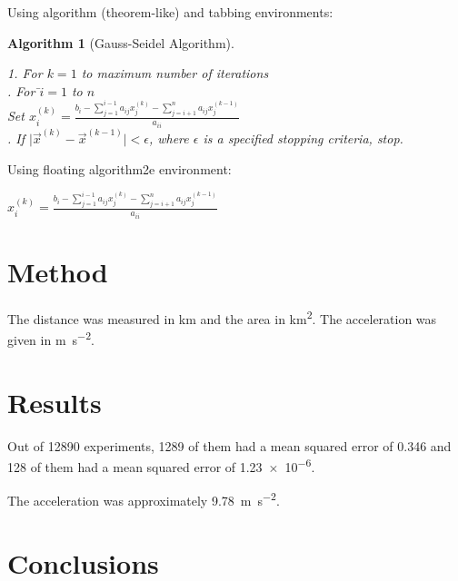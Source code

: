 \documentclass[oneside,12pt]{scrbook}
\theoremstyle{break}
\newtheorem{algorithm}[algocf]{Algorithm}
\begin{document}
Using algorithm (theorem-like) and tabbing environments:

\begin{algorithm}[Gauss-Seidel Algorithm]
\begin{tabbing}
1. \=For $k=1$ to maximum number of iterations\\
. For \=$i=1$ to $n$\\
\>\>Set
\begin{math}
x_i^{(k)} =
\frac{b_i-\sum_{j=1}^{i-1}a_{ij}x_j^{(k)}
-\sum_{j=i+1}^{n}a_{ij}x_j^{(k-1)}}%
{a_{ii}}
\end{math}
\\
. If $\lvert\vec{x}^{(k)}-\vec{x}^{(k-1)}\rvert < \epsilon$,
where $\epsilon$ is a specified stopping criteria, stop.
\end{tabbing}
\end{algorithm}

Using floating algorithm2e environment:

\begin{algorithm2e}
\caption{Gauss-Seidel Algorithm}\label{alg:gauss-seidel}
{
   {
     $
      x_i^{(k)} =
      \frac{b_i-\sum_{j=1}^{i-1}a_{ij}x_j^{(k)}
      -\sum_{j=i+1}^{n}a_{ij}x_j^{(k-1)}}%
      {a_{ii}}
      $\;
   }
}
\end{algorithm2e}


\chapter{Method}
\label{ch:method}

The distance was measured in \si{\kilo\metre} and the area in
\si{\kilo\metre\squared}. The acceleration was given in
\si{\metre\per\square\second}.

\chapter{Results}
\label{ch:results}

Out of \num{12890} experiments, \num{1289} of them had a mean
squared error of \num{.346} and \num{128} of them had a mean
squared error of \num{1.23e-6}.

The acceleration was approximately
\SI{9.78}{\metre\per\square\second}.


\chapter{Conclusions}
\label{ch:conc}


\backmatter


\printbibliography
\end{document}
